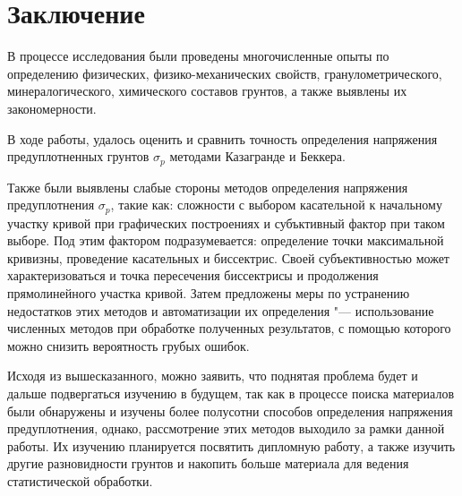 \chapter*{Заключение}                       %


В процессе исследования были проведены многочисленные опыты по определению физических, физико-механических свойств, гранулометрического, минералогического, химического составов грунтов, а также выявлены их закономерности. 

В ходе работы, удалось оценить и сравнить точность определения напряжения предуплотненных грунтов $\sigma_p$ методами Казагранде и Беккера. 

Также были выявлены слабые стороны методов определения напряжения предуплотнения $\sigma_p$, такие как: сложности с выбором касательной к начальному участку кривой при графических построениях и субъктивный фактор при таком выборе. Под этим фактором подразумевается: определение точки максимальной кривизны, проведение касательных и биссектрис. Своей субъективностью может характеризоваться и точка пересечения биссектрисы и продолжения прямолинейного участка кривой.
Затем предложены меры по устранению недостатков этих методов и автоматизации их определения "--- использование численных методов при обработке полученных результатов, с помощью которого можно снизить вероятность грубых ошибок.


Исходя из вышесказанного, можно заявить, что поднятая проблема будет и дальше подвергаться изучению в будущем, так как в процессе поиска материалов были обнаружены и изучены более полусотни способов определения напряжения предуплотнения, однако, рассмотрение этих методов выходило за рамки данной работы. 
Их изучению планируется посвятить дипломную работу, а также изучить другие разновидности грунтов и накопить больше материала для ведения статистической обработки.
